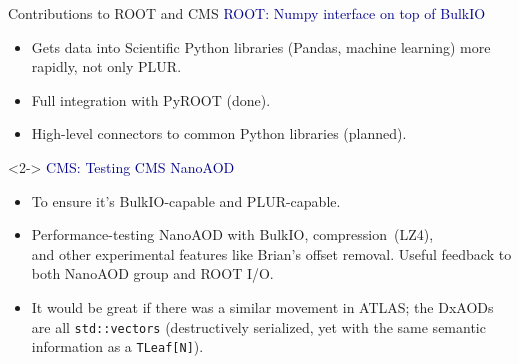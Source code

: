\documentclass{beamer}
\begin{document}
\begin{frame}{Contributions to ROOT and CMS}
\vspace{0.5 cm}
\textcolor{darkblue}{ROOT: Numpy interface on top of BulkIO}
\begin{itemize}
\item Gets data into Scientific Python libraries (Pandas, machine learning) more rapidly, not only PLUR.
\item Full integration with PyROOT (done).
\item High-level connectors to common Python libraries (planned).
\end{itemize}

\vspace{0.5 cm}
\begin{uncoverenv}<2->
\textcolor{darkblue}{CMS: Testing CMS NanoAOD}
\begin{itemize}
\item To ensure it's BulkIO-capable and PLUR-capable.
\item Performance-testing NanoAOD with BulkIO, \mbox{compression (LZ4),\hspace{-1 cm}} \\ and other experimental features like Brian's offset removal. Useful feedback to both NanoAOD group and ROOT I/O.
\item It would be great if there was a similar movement in ATLAS; the DxAODs are all {\tt\small std::vectors} (destructively serialized, yet with the same semantic information as a {\tt\small TLeaf[N]}).
\end{itemize}
\end{uncoverenv}
\end{frame}
\end{document}
